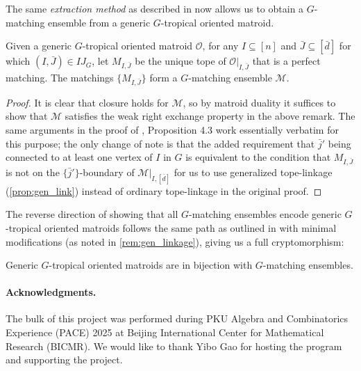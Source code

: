 \documentclass[letterpaper,reqno,11pt]{amsart}
\begin{document}
The same \emph{extraction method} as described in \cite{oh2013ensembles} now allows us to obtain a $G$-matching ensemble from a generic $G$-tropical oriented matroid.

\begin{proposition}
    Given a generic $G$-tropical oriented matroid $\mathcal{O}$, for any $I\subseteq [n]$ and $\bar{J}\subseteq [\bar{d}]$ for which $(I, \bar{J})\in IJ_G$, let $M_{I, \bar{J}}$ be the unique tope of $\mathcal{O}|_{I, \bar{J}}$ that is a perfect matching. The matchings $\{M_{I, \bar{J}}\}$ form a $G$-matching ensemble $\mathcal{M}$.
\end{proposition}

\begin{proof}
    It is clear that closure holds for $\mathcal{M}$, so by matroid duality it suffices to show that $\mathcal{M}$ satisfies the weak right exchange property in the above remark. The same arguments in the proof of \cite{oh2013ensembles}, Proposition 4.3 work essentially verbatim for this purpose; the only change of note is that the added requirement that $\bar{j}'$ being connected to at least one vertex of $I$ in $G$ is equivalent to the condition that $M_{I, \bar{J}}$ is not on the $\{\bar{j}'\}$-boundary of $\mathcal{M}|_{I, [\bar{d}]}$ for us to use generalized tope-linkage (\cref{prop:gen_link}) instead of ordinary tope-linkage in the original proof.
\end{proof}

The reverse direction of showing that all $G$-matching ensembles encode generic $G$-tropical oriented matroids follows the same path as outlined in \cite{yao2025linkage} with minimal modifications (as noted in \cref{rem:gen_linkage}), giving us a full cryptomorphism:

\begin{theorem}
    Generic $G$-tropical oriented matroids are in bijection with $G$-matching ensembles.
\end{theorem}

\bigskip

\paragraph{\bfseries Acknowledgments.} 
The bulk of this project was performed during PKU Algebra and Combinatorics Experience (PACE) 2025 at Beijing International Center for Mathematical Research (BICMR). We would like to thank Yibo Gao for hosting the program and supporting the project.




\end{document}
